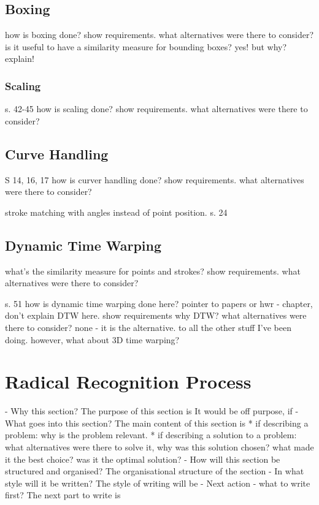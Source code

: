 \subsection{Boxing}
\label{sec:hwre:boxing}
how is boxing done?
show requirements.
what alternatives were there to consider?
is it useful to have a similarity measure for bounding boxes?
yes! but why? explain!



\subsubsection{Scaling}
\label{sec:hwre:scaling}



s. 42-45
how is scaling done?
show requirements.
what alternatives were there to consider?

\subsection{Curve Handling}
\label{sec:hwre:curvehandling}



S 14, 16, 17
how is curver handling done?
show requirements.
what alternatives were there to consider?

stroke matching with angles instead of point position.
s. 24

\subsection{Dynamic Time Warping}
\label{sec:hwre:dynamictimewarping}



what's the similarity measure for
points and strokes?
show requirements.
what alternatives were there to consider?

s. 51
how is dynamic time warping done here?
pointer to papers or hwr - chapter, don't explain DTW here.
show requirements
why DTW?
what alternatives were there to consider?
none - it is the alternative.
to all the other stuff I've been doing.
however, what about 3D time warping?


\section{Radical Recognition Process}
\label{sec:hwre:radicalrecognitionprocess}

- Why this section? 
  The purpose of this section is 
  It would be off purpose, if 
- What goes into this section?
  The main content of this section is 
  * if describing a problem: why is the problem relevant.
  * if describing a solution to a problem: what alternatives were
    there to solve it, why was this solution chosen? 
    what made it the best choice? was it the optimal solution?
- How will this section be structured and organised?
  The organisational structure of the section 
- In what style will it be written?
  The style of writing will be 
- Next action - what to write first?
  The next part to write is


